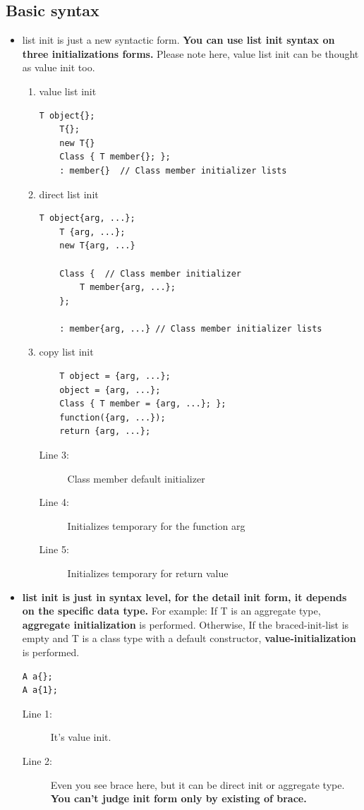 \documentclass[a4paper,11pt,twoside]{book}
\begin{document}
\subsection{Basic syntax}
\begin{itemize}
		
	\item list init is just a new syntactic form. \textbf{You can use list init syntax on three initializations forms.} Please note here, value list init can be thought as value init too.  
	\begin{enumerate}
		\item value list init
\begin{lstlisting}[numbers=none]
	T object{};
	T{};
	new T{}
	Class { T member{}; };
	: member{}  // Class member initializer lists
\end{lstlisting}
		\item direct list init
\begin{lstlisting}[numbers=none]
	T object{arg, ...};
	T {arg, ...};
	new T{arg, ...}
	
	Class {  // Class member initializer
		T member{arg, ...}; 
	};
			
	: member{arg, ...} // Class member initializer lists
\end{lstlisting}
		\item copy list init
\begin{lstlisting}
	T object = {arg, ...};
	object = {arg, ...};
	Class { T member = {arg, ...}; };
	function({arg, ...}); 
	return {arg, ...};  
\end{lstlisting}
		\begin{description}
			\item[Line 3:] Class member default initializer
			\item[Line 4:] Initializes temporary for the function arg
			\item[Line 5:] Initializes temporary for return value
		\end{description}
	\end{enumerate}
	
	\item \textbf{list init is just in syntax level, for the detail init form, it depends on the specific data type.}  For example: If T is an aggregate type, \textbf{aggregate initialization} is performed. Otherwise, If the braced-init-list is empty and T is a class type with a default constructor, \textbf{value-initialization} is performed.
	
\begin{lstlisting}
A a{};
A a{1};	
\end{lstlisting}
	\begin{description}
		\item[Line 1:] It's value init.
		\item[Line 2:] Even you see brace here, but it can be direct init or aggregate type. \textbf{You can't judge init form only by existing of brace.}
	\end{description}
	

\end{itemize}
\end{document}
